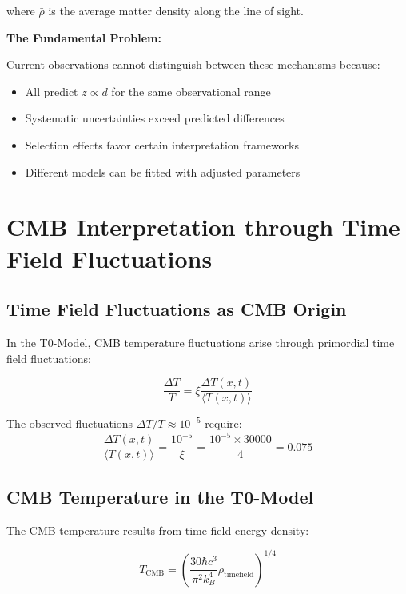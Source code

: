 \documentclass[12pt,a4paper]{report}
\newcommand{\Tfield}{T(x,t)}  %
\newcommand{\xipar}{\xi}      %
\begin{document}
where $\bar{\rho}$ is the average matter density along the line of sight.

\textbf{The Fundamental Problem:}

Current observations cannot distinguish between these mechanisms because:
\begin{itemize}
	\item All predict $z \propto d$ for the same observational range
	\item Systematic uncertainties exceed predicted differences
	\item Selection effects favor certain interpretation frameworks
	\item Different models can be fitted with adjusted parameters
\end{itemize}
	\section{CMB Interpretation through Time Field Fluctuations}\label{sec:cmb_interpretation}
	
	\subsection{Time Field Fluctuations as CMB Origin}\label{subsec:timefield_fluctuations_cmb}
	
	In the T0-Model, CMB temperature fluctuations arise through primordial time field fluctuations:
	
	\begin{equation}\label{eq:temperature_fluctuation}
		\frac{\Delta T}{T} = \xipar \frac{\Delta \Tfield}{\langle \Tfield \rangle}
	\end{equation}
	
	The observed fluctuations $\Delta T/T \approx 10^{-5}$ require:
	\begin{equation}
		\frac{\Delta \Tfield}{\langle \Tfield \rangle} = \frac{10^{-5}}{\xipar} = \frac{10^{-5} \times 30000}{4} = 0.075
	\end{equation}
	
	\subsection{CMB Temperature in the T0-Model}\label{subsec:cmb_temperature_t0}
	
	The CMB temperature results from time field energy density:
	
	\begin{equation}\label{eq:cmb_temperature_t0}
		T_{\text{CMB}} = \left(\frac{30 \hbar c^3}{\pi^2 k_B^4} \rho_{\text{timefield}}\right)^{1/4}
	\end{equation}
	
\end{document}
